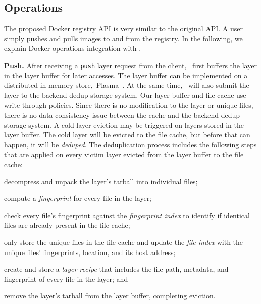 \subsection{Operations}
\label{sec:design_operations}

%
The proposed Docker registry API is very similar to the original API.
A user simply pushes and pulls images to and from the registry. 
In the following, we explain Docker operations integration with \sysname.


\textbf{Push.}
After receiving a \texttt{push} layer request from the client, 
\sysname~first buffers the layer in the layer buffer for later accesses. 
The layer buffer can be implemented on a distributed in-memory store,~\eg Plasma~\cite{plasma}.
At the same time, \sysname~will also submit the layer to the backend dedup storage system.
Our layer buffer and file cache use write through policies. 
Since there is no modification to the layer or unique files, 
there is no data consistency issue between the cache and the backend dedup storage system.
A cold layer eviction may be triggered on layers stored in the layer buffer.
The cold layer will be evicted to the file cache, but before that can happen, it will be \emph{deduped}.
The deduplication process includes the following steps 
that are applied on every victim layer evicted from the layer buffer to the file cache:

\begin{compactenumerate}
	\item decompress and unpack the layer's tarball into individual files;
	\item compute a \emph{fingerprint} for every file in the layer;
	\item check every file's fingerprint against the \emph{fingerprint index} to
	identify if identical files are already present in the file cache;
	\item only store the unique files in the file cache and update the 
	\emph{file index} with the unique files' fingerprints, location, and its host address;
	\item create and store a \emph{layer recipe} that includes the file path,
	metadata, and fingerprint of every file in the layer; and
	\item remove the layer's tarball from the layer buffer, completing eviction.
\end{compactenumerate}

